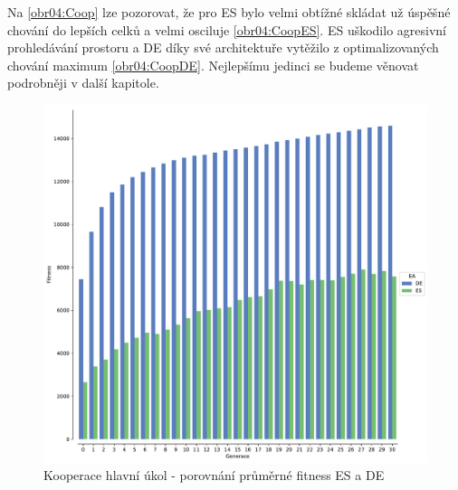 	Na \ref{obr04:Coop} lze pozorovat, že pro ES bylo velmi obtížné skládat už úspěšné chování do lepších celků a velmi osciluje \ref{obr04:CoopES}. ES uškodilo agresivní prohledávání prostoru a DE díky své architektuře vytěžilo z optimalizovaných chování maximum \ref{obr04:CoopDE}. Nejlepšímu jedinci se budeme věnovat podrobněji v další kapitole. 
		\clearpage
		\begin{figure}[t]\centering
		\includegraphics[width=\columnwidth]{../img/WoodMap/DEvsES/WoodCoopMem}
		\caption{Kooperace  hlavní úkol  - porovnání průměrné fitness ES a DE}
		\label{obr04:CoopESvsDE}
	\end{figure}
